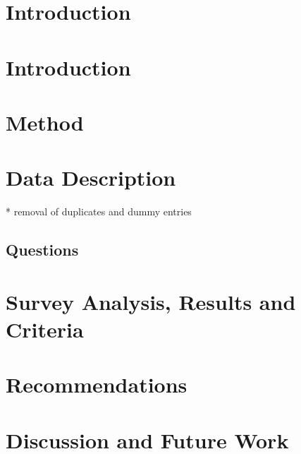 \documentclass[headsepline,titlepage,twoside,12pt]{report}
\begin{document}
\chapter{Introduction}\label{ch:introduction}

\chapter{Introduction}\label{ch:introduction}

\chapter{Method}\label{ch:introduction}

\chapter{Data Description}\label{ch:introduction}
* removal of duplicates and dummy entries

\section{Questions}

\chapter{Survey Analysis, Results and Criteria}\label{ch:introduction}

\chapter{Recommendations}\label{ch:introduction}

\chapter{Discussion and Future Work}\label{ch:introduction}
\end{document}
